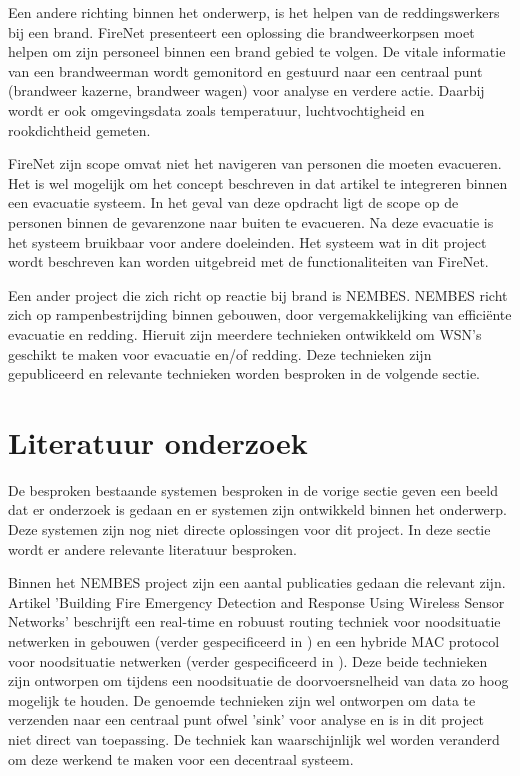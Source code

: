 Een andere richting binnen het onderwerp, is het helpen van de reddingswerkers bij een brand. FireNet 
\cite{ShaWSN} presenteert een oplossing die brandweerkorpsen moet helpen om zijn personeel binnen een brand gebied te volgen. De vitale informatie van een brandweerman wordt gemonitord en gestuurd naar een centraal punt (brandweer kazerne, brandweer wagen) voor analyse en verdere actie. Daarbij wordt er ook omgevingsdata zoals temperatuur, luchtvochtigheid en rookdichtheid gemeten.

FireNet zijn scope omvat niet het navigeren van personen die moeten evacueren. Het is wel mogelijk om het concept beschreven in dat artikel te integreren binnen een evacuatie systeem. In het geval van deze opdracht ligt de scope op de personen binnen de gevarenzone naar buiten te evacueren. Na deze evacuatie is het systeem bruikbaar voor andere doeleinden. Het systeem wat in dit project wordt beschreven kan worden uitgebreid met de functionaliteiten van FireNet.

Een ander project die zich richt op reactie bij brand is NEMBES.\cite{NEMBES} NEMBES richt zich op rampenbestrijding binnen gebouwen, door vergemakkelijking van efficiënte evacuatie en redding. Hieruit zijn meerdere technieken ontwikkeld om WSN's geschikt te maken voor evacuatie en/of redding. Deze technieken zijn gepubliceerd en relevante technieken worden besproken in de volgende sectie.

\section{Literatuur onderzoek}
\label{sec:litonderzoek}

De besproken bestaande systemen besproken in de vorige sectie geven een beeld dat er onderzoek is gedaan en er systemen zijn ontwikkeld binnen het onderwerp. Deze systemen zijn nog niet directe oplossingen voor dit project. In deze sectie wordt er andere relevante literatuur besproken.

Binnen het NEMBES project\cite{NEMBES} zijn een aantal publicaties gedaan die relevant zijn. Artikel 'Building Fire Emergency Detection and Response Using Wireless Sensor Networks'\cite{ZengFire} beschrijft een real-time en robuust routing techniek voor noodsituatie netwerken in gebouwen (verder gespecificeerd in \cite{ZengRTRR}) en een hybride MAC protocol voor noodsituatie netwerken (verder gespecificeerd in \cite{ZengERMAC}). Deze beide technieken zijn ontworpen om tijdens een noodsituatie de doorvoersnelheid van data zo hoog mogelijk te houden. De genoemde technieken zijn wel ontworpen om data te verzenden naar een centraal punt ofwel 'sink' voor analyse en is in dit project niet direct van toepassing. De techniek kan waarschijnlijk wel worden veranderd om deze werkend te maken voor een decentraal systeem.

